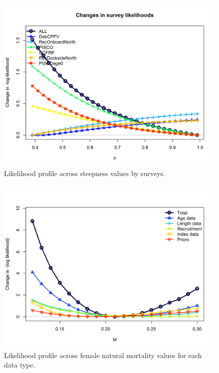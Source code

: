 \documentclass[12pt,]{article}
\begin{document}
\begin{figure}
\centering
\includegraphics{Figures/profile_h_piner2.png}
\caption{Likelihood profile across steepness values by surveys.
\label{fig:profile_h_piner2}}
\end{figure}

\FloatBarrier

\FloatBarrier 

\begin{figure}
\centering
\includegraphics{Figures/profile_m_like.png}
\caption{Likelihood profile across female natural mortality values for
each data type. \label{fig:profile_m_like}}
\end{figure}
\end{document}

